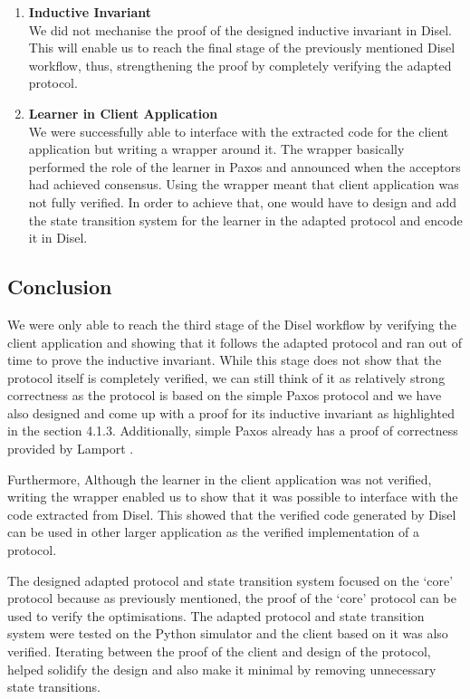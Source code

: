 \begin{enumerate}
  \item \textbf{Inductive Invariant} \\
    We did not mechanise the proof of the designed inductive invariant in Disel.
    This will enable us to reach the final stage of the previously mentioned Disel workflow,
    thus, strengthening the proof by completely verifying the adapted protocol.
  \item \textbf{Learner in Client Application} \\
    We were successfully able to interface with the extracted code for the client
    application but writing a wrapper around it. The wrapper basically performed
    the role of the learner in Paxos and announced when the acceptors had
    achieved consensus. Using the wrapper meant that client application was not
    fully verified. In order to achieve that, one would have to design and add the
    state transition system for the learner in the adapted protocol and encode it
    in Disel.
\end{enumerate}

\subsection{Conclusion}
We were only able to reach the third stage of the Disel workflow by
verifying the client application and showing that it follows the
adapted protocol and ran out of time to prove the inductive invariant.
While this stage does not show that the protocol itself
is completely verified, we can still think of it as relatively strong
correctness as the protocol is based on the simple Paxos protocol and
we have also designed and come up with a proof for its inductive invariant
as highlighted in the section 4.1.3. Additionally, simple Paxos already has
a proof of correctness provided by Lamport \cite{4}.

Furthermore, Although the learner in the client application was not verified,
writing the wrapper enabled us to show that it was possible to interface with
the code extracted from Disel. This showed that the verified code generated by
Disel can be used in other larger application as the verified implementation of
a protocol.

The designed adapted protocol and state transition system focused on
the `core' protocol because as previously mentioned, the proof of the `core'
protocol can be used to verify the optimisations. The adapted protocol and
state transition system were tested on the Python simulator and the client
based on it was also verified. Iterating between the proof of the client
and design of the protocol, helped solidify the design and also make it
minimal by removing unnecessary state transitions.

